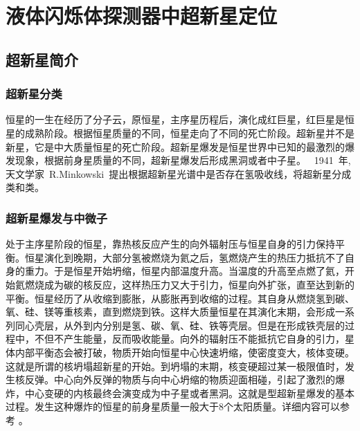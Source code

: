 
\chapter{液体闪烁体探测器中超新星定位}
\label{chap:chap6}
\section{超新星简介}
\subsection{超新星分类}
恒星的一生在经历了分子云，原恒星，主序星历程后，演化成红巨星，红巨星是恒星的成熟阶段。根据恒星质量的不同，恒星走向了不同的死亡阶段。超新星并不是新星，它是中大质量恒星的死亡阶段。超新星爆发是恒星世界中已知的最激烈的爆发现象，根据前身星质量的不同，超新星爆发后形成黑洞或者中子星。
~1941~年, 天文学家~R.Minkowski~提出根据超新星光谱中是否存在氢吸收线，将超新星分成
\uppercase\expandafter{}类和\uppercase\expandafter{}类\citep{minkowski1941spectra}。
\subsection{超新星爆发与中微子}
处于主序星阶段的恒星，靠热核反应产生的向外辐射压与恒星自身的引力保持平衡。恒星演化到晚期，大部分氢被燃烧为氦之后，氢燃烧产生的热压力抵抗不了自身的重力。于是恒星开始坍缩，恒星内部温度升高。当温度的升高至点燃了氦，开始氦燃烧成为碳的核反应，这样热压力又大于引力，恒星向外扩张，直至达到新的平衡。恒星经历了从收缩到膨胀，从膨胀再到收缩的过程。其自身从燃烧氢到碳、氧、硅、镁等重核素，直到燃烧到铁。这样大质量恒星在其演化末期，会形成一系列同心壳层，从外到内分别是氢、碳、氧、硅、铁等壳层。但是在形成铁壳层的过程中，不但不产生能量，反而吸收能量。向外的辐射压不能抵抗它自身的引力，星体内部平衡态会被打破，物质开始向恒星中心快速坍缩，使密度变大，核体变硬。这就是所谓的核坍塌超新星的开始。到坍塌的末期，核变硬超过某一极限值时，发生核反弹。中心向外反弹的物质与向中心坍缩的物质迎面相碰，引起了激烈的爆炸，中心变硬的内核最终会演变成为中子星或者黑洞。这就是\uppercase\expandafter{}型超新星爆发的基本过程。发生这种爆炸的恒星的前身星质量一般大于8个太阳质量。详细内容可以参考
\citep{bethe1990supernova}。

